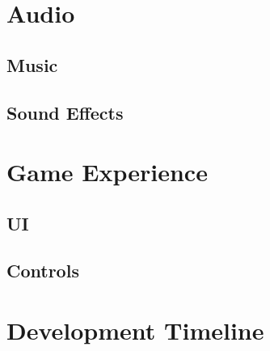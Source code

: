 \documentclass[a4paper]{article}
\begin{document}
  \section{Audio}
  \subsection{Music}
  \subsection{Sound Effects}
  \section{Game Experience}
  \subsection{UI}
  \subsection{Controls}
  \section{Development Timeline}
\end{document}
